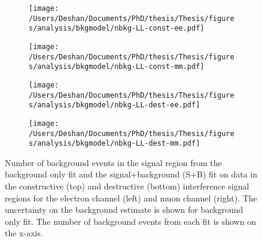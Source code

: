 \begin{figure}[h!]
    \centering
    \begin{subfigure}[b]{0.49\textwidth}
        \centering
        \texttt{[image: /Users/Deshan/Documents/PhD/thesis/Thesis/figures/analysis/bkgmodel/nbkg-LL-const-ee.pdf]}
        \label{fig:bkgmodel:fitsbplusb1}
    \end{subfigure}
    \begin{subfigure}[b]{0.49\textwidth}
        \centering
        \texttt{[image: /Users/Deshan/Documents/PhD/thesis/Thesis/figures/analysis/bkgmodel/nbkg-LL-const-mm.pdf]}
        \label{fig:bkgmodel:fitsbplusb2}
    \end{subfigure}
    \begin{subfigure}[b]{0.49\textwidth}
        \centering
        \texttt{[image: /Users/Deshan/Documents/PhD/thesis/Thesis/figures/analysis/bkgmodel/nbkg-LL-dest-ee.pdf]}
        \label{fig:bkgmodel:fitsbplusb3}
    \end{subfigure}
    \begin{subfigure}[b]{0.49\textwidth}
        \centering
        \texttt{[image: /Users/Deshan/Documents/PhD/thesis/Thesis/figures/analysis/bkgmodel/nbkg-LL-dest-mm.pdf]}
        \label{fig:bkgmodel:fitsbplusb4}
    \end{subfigure}
    \caption[Background estimation comparisons of the signal+background fit and background only fit]{Number of background events in the signal region from the background only fit and the signal+background (S+B) fit on data in the constructive (top) and destructive (bottom) interference signal regions for the electron channel (left) and muon channel (right). The uncertainty on the background estimate is shown for background only fit. The number of background events from each fit is shown on the x-axis.}
    \label{fig:bkgmodel:fitsbplusb}
\end{figure}

